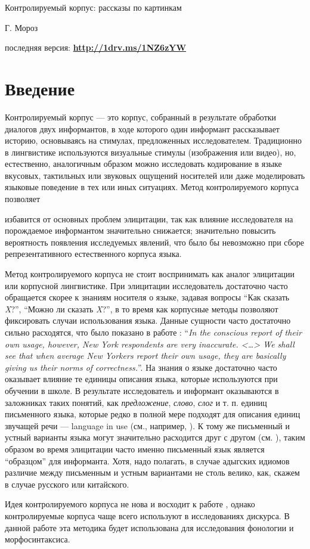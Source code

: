 

\begin{center}{\Large Контролируемый корпус: рассказы по картинкам}
\end{center}
\begin{flushright}
	{\footnotesize Г. Мороз}
\end{flushright}
{\noindent\footnotesize последняя версия: \textbf{\href{http://1drv.ms/1NZ6zYW}{http://1drv.ms/1NZ6zYW}}}
\vspace{5mm}
\section{Введение}
\noindent Контролируемый корпус --- это корпус, собранный в результате обработки диалогов двух информантов, в ходе которого один информант рассказывает историю, основываясь на стимулах, предложенных исследователем. Традиционно в лингвистике используются визуальные стимулы (изображения или видео), но, естественно, аналогичным образом можно исследовать кодирование в языке вкусовых, тактильных или звуковых ощущений носителей или даже моделировать языковые поведение в тех или иных ситуациях. Метод контролируемого корпуса позволяет
\begin{itemize}
\mytem  избавится от основных проблем элицитации, так как влияние исследователя на порождаемое информантом значительно снижается;
\mytem значительно повысить вероятность появления исследуемых явлений, что было бы невозможно при сборе репрезентативного естественного корпуса языка.
\end{itemize}
Метод контролируемого корпуса не стоит воспринимать как аналог элицитации или корпусной лингвистике. При элицитации исследователь достаточно часто обращается скорее к знаниям носителя о языке, задавая вопросы ``Как сказать \textit{X}?'', ``Можно ли сказать \textit{X}?'', в то время как корпусные методы позволяют фиксировать случаи использования языка. Данные сущности часто достаточно сильно расходятся, что было показано в работе \citep[300]{labov64}: ``\textit{In the conscious report of their own usage, however, New York respondents are very inaccurate. <\dots> We shall see that when average New Yorkers report their own usage, they are basically giving us their norms of correctness.}''. На знания о языке достаточно часто оказывает влияние те единицы описания языка, которые используются при обучении в школе. В результате исследователь и информант оказываются в заложниках таких понятий, как \textit{предложение}, \textit{слово}, \textit{слог} и т. п. единиц письменного языка, которые редко в полной мере подходят для описания единиц звучащей речи --- language in use (см., например, \citep{miller98}). К тому же письменный и устный варианты языка могут значительно расходится друг с другом (см. \cite[40-42]{lyons68}), таким образом во время элицитации часто именно письменный язык является ``образцом'' для информанта. 
Хотя, надо полагать, в случае адыгских идиомов различие между письменным и устным вариантами не столь велико, как, скажем в случае русского или китайского.
\par Идея контролируемого корпуса не нова и восходит к работе \citep{chafe80}, однако контролируемые корпуса чаще всего используют в исследованиях дискурса. В данной работе эта методика будет использована для исследования фонологии и морфосинтаксиса.
